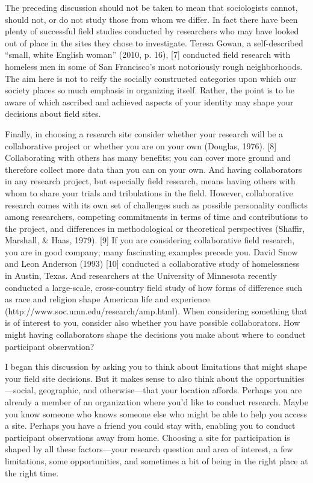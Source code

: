 The preceding discussion should not be taken to mean that sociologists cannot, should not, or do not study those from whom we differ. In fact there have been plenty of successful field studies conducted by researchers who may have looked out of place in the sites they chose to investigate. Teresa Gowan, a self-described “small, white English woman” (2010, p. 16), [7] conducted field research with homeless men in some of San Francisco’s most notoriously rough neighborhoods. The aim here is not to reify the socially constructed categories upon which our society places so much emphasis in organizing itself. Rather, the point is to be aware of which ascribed and achieved aspects of your identity may shape your decisions about field sites.

Finally, in choosing a research site consider whether your research will be a collaborative project or whether you are on your own (Douglas, 1976). [8] Collaborating with others has many benefits; you can cover more ground and therefore collect more data than you can on your own. And having collaborators in any research project, but especially field research, means having others with whom to share your trials and tribulations in the field. However, collaborative research comes with its own set of challenges such as possible personality conflicts among researchers, competing commitments in terms of time and contributions to the project, and differences in methodological or theoretical perspectives (Shaffir, Marshall, \& Haas, 1979). [9] If you are considering collaborative field research, you are in good company; many fascinating examples precede you. David Snow and Leon Anderson (1993) [10] conducted a collaborative study of homelessness in Austin, Texas. And researchers at the University of Minnesota recently conducted a large-scale, cross-country field study of how forms of difference such as race and religion shape American life and experience (http://www.soc.umn.edu/research/amp.html). When considering something that is of interest to you, consider also whether you have possible collaborators. How might having collaborators shape the decisions you make about where to conduct participant observation?

I began this discussion by asking you to think about limitations that might shape your field site decisions. But it makes sense to also think about the opportunities—social, geographic, and otherwise—that your location affords. Perhaps you are already a member of an organization where you’d like to conduct research. Maybe you know someone who knows someone else who might be able to help you access a site. Perhaps you have a friend you could stay with, enabling you to conduct participant observations away from home. Choosing a site for participation is shaped by all these factors—your research question and area of interest, a few limitations, some opportunities, and sometimes a bit of being in the right place at the right time.

